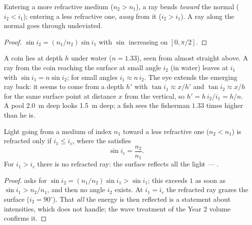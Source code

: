 \begin{proposition}\label{prop:b1:rays-reflection-refraction:bending}
Entering a more refractive medium ($n_2 > n_1$), a ray bends
\emph{toward} the normal ($i_2 < i_1$); entering a less refractive one,
\emph{away} from it ($i_2 > i_1$). A ray along the normal goes through
undeviated.
\end{proposition}

\begin{proof}
$\sin i_2 = (n_1/n_2)\sin i_1$ with $\sin$ increasing on
$[0, \pi/2]$.
\end{proof}

\begin{example}\label{ex:b1:rays-reflection-refraction:depth}
A coin lies at depth $h$ under water ($n = 1.33$), seen from almost
straight above. A ray from the coin reaching the surface at small angle
$i_2$ (in water) leaves at $i_1$ with $\sin i_1 = n\sin i_2$; for small
angles $i_1 \approx n\,i_2$. The eye extends the emerging ray back: it
seems to come from a depth $h'$ with $\tan i_1 \approx x/h'$ and
$\tan i_2 \approx x/h$ for the same surface point at distance $x$ from
the vertical, so $h' = h\,i_2/i_1 = h/n$. A pool \qty{2.0}{m} deep looks
\qty{1.5}{m} deep; a fish sees the fisherman $1.33$ times higher than
he is.
\end{example}

\begin{theorem}\label{thm:b1:rays-reflection-refraction:tir}
Light going from a medium of index $n_1$ toward a less refractive one
($n_2 < n_1$) is refracted only if $i_1 \leq i_c$, where the
\emph{} satisfies
\[
\sin i_c = \frac{n_2}{n_1} .
\]
For $i_1 > i_c$ there is no refracted ray: the surface reflects all the
light --- \emph{}.
\end{theorem}

\begin{proof}
 asks for $\sin i_2 = (n_1/n_2)\sin i_1 > \sin i_1$; this
exceeds $1$ as soon as $\sin i_1 > n_2/n_1$, and then no angle $i_2$
exists. At $i_1 = i_c$ the refracted ray grazes the surface
($i_2 = 90^\circ$). That \emph{all} the energy is then reflected is a
statement about intensities, which  does not handle; the
wave treatment of the Year 2 volume confirms it.
\end{proof}

